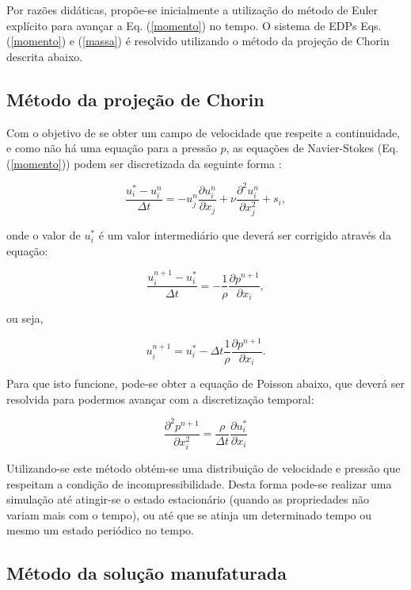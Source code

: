 Por razões didáticas, propõe-se inicialmente a utilização do método de Euler
explícito para avançar a Eq. (\ref{momento}) no tempo. O sistema de EDPs Eqs.
(\ref{momento}) e (\ref{massa}) é resolvido utilizando o método da projeção de
Chorin \cite{chorin1968} descrita abaixo.


\subsection{Método da projeção de Chorin}

Com o objetivo de se obter um campo de velocidade que respeite a continuidade,
e como não há uma equação para a pressão $p$, as equações de Navier-Stokes (Eq.
(\ref{momento})) podem ser discretizada da seguinte forma \cite{chorin1968}:

\[
\frac{u_i^* - u_i^n}{\Delta t} = - u_j^n \frac{\partial u_i^n}{\partial x_j} + \nu \frac{\partial^2 u_i^n}{\partial x_j^2} + s_i,
\]

\noindent onde o valor de $u_i^*$ é um valor intermediário que deverá ser
corrigido através da equação:

\[
\frac{u_i^{n+1} - u_i^*}{\Delta t} = - \frac{1}{\rho} \frac{\partial p^{n+1}}{\partial x_i},
\]

\noindent ou seja,

\[
u_i^{n+1} = u_i^* - \Delta t \frac{1}{\rho} \frac{\partial p^{n+1}}{\partial x_i}.
\]

\noindent Para que isto funcione, pode-se obter a equação de Poisson abaixo, que deverá ser
resolvida para podermos avançar com a discretização temporal:

\[
\frac{\partial^2 p^{n+1}}{\partial x_i^2} = \frac{\rho}{\Delta t} \frac{\partial u_i^*}{\partial x_i}
\]

Utilizando-se este método obtém-se uma distribuição de velocidade e pressão que
respeitam a condição de incompressibilidade. Desta forma pode-se realizar uma
simulação até atingir-se o estado estacionário (quando as propriedades não
variam mais com o tempo), ou até que se atinja um determinado tempo ou mesmo um
estado periódico no tempo.

\subsection{Método da solução manufaturada}

